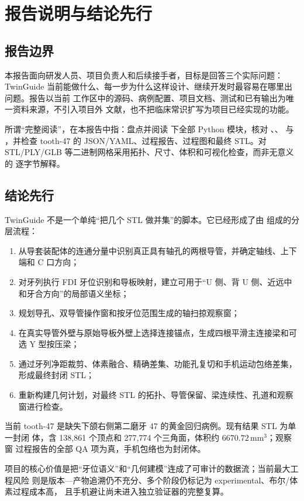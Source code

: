 \chapter*{报告说明与结论先行}

\section*{报告边界}

本报告面向研发人员、项目负责人和后续接手者，目标是回答三个实际问题：TwinGuide
当前能做什么、每一步为什么这样设计、继续开发时最容易在哪里出问题。报告以当前
工作区中的源码、病例配置、项目文档、测试和已有输出为唯一资料来源，不引入项目外
文献，也不把临床常识扩写为项目已经实现的功能。

所谓“完整阅读”，在本报告中指：盘点并阅读  下全部
Python 模块，核对 、、
与 ，并检查 tooth-47 的 JSON/YAML、过程报告、过程图和最终
STL。对 STL/PLY/GLB 等二进制网格采用拓扑、尺寸、体积和可视化检查，而非无意义的
逐字节解释。

\section*{结论先行}

TwinGuide 不是一个单纯“把几个 STL 做并集”的脚本。它已经形成了由
组成的分层流程：

\begin{enumerate}
  \item 从导套装配体的连通分量中识别真正具有轴孔的两根导管，并确定轴线、上下端和 C 口方向；
  \item 对牙列执行 FDI 牙位识别和导板映射，建立可用于“U 侧、背 U 侧、近远中和牙合方向”的局部语义坐标；
  \item 规划导孔、双导管操作窗和按牙位范围生成的轴扫掠观察窗；
  \item 在真实导管外壁与原始导板外壁上选择连接锚点，生成四根平滑主连接梁和可选 Y 型按压梁；
  \item 通过牙列净距裁剪、体素融合、精确差集、功能孔复切和手机运动包络差集，形成最终封闭 STL；
  \item 重新构建几何计划，对最终 STL 的拓扑、导管保留、梁连续性、孔道和观察窗进行检查。
\end{enumerate}

当前 tooth-47 是缺失下颌右侧第二磨牙 47 的黄金回归病例。现有结果 STL 为单一封闭
体，含 138,861 个顶点和 277,774 个三角面，体积约 $6670.72\,\mathrm{mm^3}$；观察窗
过程报告的全部 QA 项为真，手机包络也为封闭体。

\begin{takeaway}
项目的核心价值是把“牙位语义”和“几何建模”连成了可审计的数据流；当前最大工程风险
则是版本—产物追溯仍不充分、多个阶段仍标记为 experimental、布尔/体素过程成本高，
且手机避让尚未进入独立验证器的完整复算。
\end{takeaway}

